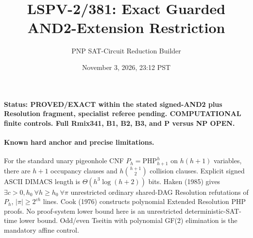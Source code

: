 \documentclass[11pt]{article}
\title{LSPV-2/381: Exact Guarded AND2-Extension Restriction}
\author{PNP SAT-Circuit Reduction Builder}
\date{November 3, 2026, 23:12 PST}
\begin{document}
\maketitle
\noindent\textbf{Status: PROVED/EXACT within the stated signed-AND2 plus Resolution fragment, specialist referee pending. COMPUTATIONAL finite controls. Full Rmix341, B1, B2, B3, and P versus NP OPEN.}
\paragraph{Known hard anchor and precise limitations.}
For the standard unary pigeonhole CNF \(P_h=\mathrm{PHP}_{h+1}^h\) on \(h(h+1)\) variables, there are \(h+1\) occupancy clauses and \(h\binom{h+1}{2}\) collision clauses. Explicit signed ASCII DIMACS length is \(\Theta(h^3\log(h+2))\) bits. Haken (1985) gives \(\exists c>0,h_0\ \forall h\ge h_0\ \forall\pi\) unrestricted ordinary shared-DAG Resolution refutations of \(P_h\), \(|\pi|\ge 2^{ch}\) lines. Cook (1976) constructs polynomial Extended Resolution PHP proofs. No proof-system lower bound here is an unrestricted deterministic-SAT-time lower bound. Odd/even Tseitin with polynomial GF(2) elimination is the mandatory affine control.
\end{document}
